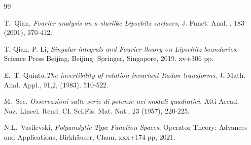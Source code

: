 \documentclass[reqno,11pt]{amsart}
\numberwithin{equation}{section}
\theoremstyle{definition}
\begin{document}
\begin{thebibliography}{99}
	    	
	    	 T.~Qian, \emph{Fourier analysis on a starlike Lipschitz surfaces}, J. Funct. Anal. , 183 (2001), 370-412.
		
	T. Qian, P. Li,\emph{
		Singular integrals and Fourier theory on Lipschitz boundaries}.
	Science Press Beijing, Beijing; Springer, Singapore, 2019. xv+306 pp.
	
	 E.~T. Quinto,\emph{The invertibility of rotation invariant Radon transforms}, J. Math. Anal. Appl., 91,2, (1983), 510-522.


    	 M.~Sce, \emph{Osservazioni sulle serie di potenze nei moduli quadratici}, Atti Accad. Naz. Lincei. Rend. CI. Sci.Fis. Mat. Nat., 23 (1957), 220-225.
	
 N.L.~Vasilevski, \emph{Polyanalytic Type Function Spaces}, Operator Theory: Advances and Applications, Birkhäuser, Cham, xxx+174 pp, 2021.

	
	\end{thebibliography}
	
\end{document}
